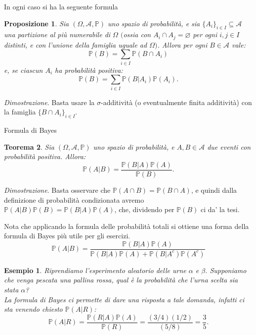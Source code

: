 \documentclass[11pt]{book}
\makeatletter
\theoremstyle{Definizione}
\theoremstyle{TeoremaProposizioneLemmaCorollario}
\newtheorem{myteo}{Teorema}[section]
\newtheorem{mypropo}[myteo]{Proposizione}
\theoremstyle{OsservazioneNota}
\newtheorem{myes}{Esempio}[section]
\renewenvironment{proof}[1][\proofname]{\par
  \normalfont \topsep6\p@\@plus6\p@\relax
  \trivlist
  \item[\hskip\labelsep
        \itshape
    #1\@addpunct{.}]\ignorespaces
}{%
  \endtrivlist\@endpefalse
}
\renewcommand{\P}{\mathbb{P}}
\renewenvironment{proof}{\textsl{Dimostrazione}.}{}
\makeatother
\begin{document}
In ogni caso si ha la seguente formula
\begin{boxpro}
\begin{mypropo}
Sia $(\Omega,\mathcal{A},\P)$ uno spazio di probabilità, e sia $\{A_i\}_{i\in I}\subseteq \mathcal{A}$ una partizione al più numerabile di $\Omega$ $($ossia con $A_i\cap A_j = \varnothing$ per ogni $i,j\in I$ distinti, e con l'unione della famiglia uguale ad $\Omega)$. Allora per ogni $B\in \mathcal{A}$ vale:
$$
\P(B) = \sum_{i\in I} \P(B\cap A_i)
$$
e, se ciascun $A_i$ ha probabilità positiva:
$$
\P(B) = \sum_{i\in I} \P(B|A_i)\P(A_i).
$$
\end{mypropo}
\tcblower
\begin{proof}
Basta usare la $\sigma$-additività (o eventualmente finita additività) con la famiglia $\{B\cap A_i\}_{i\in I}$.
\end{proof}
\end{boxpro}
\begin{boxteo}{Formula di Bayes}
\begin{myteo}\label{teo:FormulaDiBayes}
Sia $(\Omega,\mathcal{A},\P)$ uno spazio di probabilità, e $A,B\in \mathcal{A}$ due eventi con probabilità positiva. Allora:
$$
\P(A|B) = \frac{\P(B|A)\P(A)}{\P(B)}.
$$
\end{myteo}
\tcblower
\begin{proof}
Basta osservare che $\P(A\cap B) = \P(B \cap A)$, e quindi dalla definizione di probabilità condizionata avremo $\P(A|B)\P(B) = \P(B|A)\P(A)$, che, dividendo per $\P(B)$ ci da' la tesi.
\end{proof}
\end{boxteo}
\noindent
Nota che applicando la formula delle probabilità totali si ottiene una forma della formula di Bayes più utile per gli esercizi.
$$
\P(A|B) = \frac{\P(B|A)\P(A)}{\P(B|A)\P(A)+\P(B|A^c)\P(A^c)}
$$
\begin{myes}
Riprendiamo l'esperimento aleatorio delle urne $\alpha$ e $\beta$. Supponiamo che venga pescata una pallina rossa, qual è la probabilità che l'urna scelta sia stata $\alpha$?\\
La formula di Bayes ci permette di dare una risposta a tale domanda, infatti ci sta venendo chiesto $\P(A|R)$:
$$
\P(A|R) = \frac{\P(R|A)\P(A)}{\P(R)} = \frac{(3/4)(1/2)}{(5/8)} = \frac{3}{5}.
$$
\end{myes}
\end{document}
